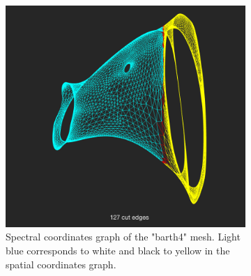 \documentclass[unicode,11pt,a4paper,oneside,numbers=endperiod,openany]{scrartcl}
\begin{document}
\begin{figure}[H]
\begin{subfigure}[b]{0.475\textwidth}
        \end{subfigure}
        \hfill
        \begin{subfigure}[b]{0.475\textwidth}   
            \centering 
            \includegraphics[width=\textwidth]{9.png}
            {{\small Spectral coordinates graph of the "barth4" mesh.  Light blue corresponds to white and black to yellow in the spatial coordinates graph.}}    
        \end{subfigure}
\label{figure:ex62meshes}
    \end{figure}
\end{document}
